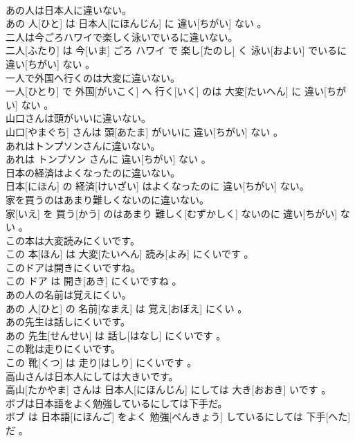 \documentclass[8pt]{extreport}
\begin{document}
\begin{CJK}{UTF8}{min}
\\	あの人は日本人に違いない。	
\\	あの 人[ひと] は 日本人[にほんじん] に 違い[ちがい] ない 。
\\	二人は今ごろハワイで楽しく泳いでいるに違いない。	
\\	二人[ふたり] は 今[いま] ごろ ハワイ で 楽し[たのし] く 泳い[およい] でいるに 違い[ちがい] ない 。
\\	一人で外国へ行くのは大変に違いない。	
\\	一人[ひとり] で 外国[がいこく] へ 行く[いく] のは 大変[たいへん] に 違い[ちがい] ない 。
\\	山口さんは頭がいいに違いない。	
\\	山口[やまぐち] さんは 頭[あたま] がいいに 違い[ちがい] ない 。
\\	あれはトンプソンさんに違いない。	
\\	あれは トンプソン さんに 違い[ちがい] ない 。
\\	日本の経済はよくなったのに違いない。	
\\	日本[にほん] の 経済[けいざい] はよくなったのに 違い[ちがい] ない。
\\	家を買うのはあまり難しくないのに違いない。	
\\	家[いえ] を 買う[かう] のはあまり 難しく[むずかしく] ないのに 違い[ちがい] ない 。
\\	この本は大変読みにくいです。	
\\	この 本[ほん] は 大変[たいへん] 読み[よみ] にくいです 。
\\	このドアは開きにくいですね。	
\\	この ドア は 開き[あき] にくいですね 。
\\	あの人の名前は覚えにくい。	
\\	あの 人[ひと] の 名前[なまえ] は 覚え[おぼえ] にくい 。
\\	あの先生は話しにくいです。	
\\	あの 先生[せんせい] は 話し[はなし] にくいです 。
\\	この靴は走りにくいです。	
\\	この 靴[くつ] は 走り[はしり] にくいです 。
\\	高山さんは日本人にしては大きいです。	
\\	高山[たかやま] さんは 日本人[にほんじん] にしては 大き[おおき] いです 。
\\	ボブは日本語をよく勉強しているにしては下手だ。	
\\	ボブ は 日本語[にほんご] をよく 勉強[べんきょう] しているにしては 下手[へた] だ 。

\end{CJK}
\end{document}
